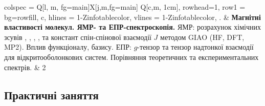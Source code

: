 \documentclass{Syllabus}
\def\lit{\textit{Література для опрацювання:\ }}
\begin{document}
\begin{longtblr}[]{
	colspec = {Q[l, m, fg=main]X[j,m,fg=main] Q[c,m, 1cm]},
    rowhead=1,
	row{1} = {bg=rowfill, c},
	hlines = {1-Z}{infotablecolor},
	vlines = {1-Z}{infotablecolor},
	}
\rownumber. & \textbf{Магнітні властивості молекул. ЯМР- та ЕПР-спектроскопія.}
   ЯМР: розрахунок хімічних зсувів , , , ,  та констант спін-спінової взаємодії $J$ методом GIAO (HF, DFT, MP2). Вплив функціоналу, базису. ЕПР: $g$-тензор та тензор надтонкої взаємодії для відкритооболонкових систем. Порівняння теоретичних та експериментальних спектрів.
   & 2
   \\

\end{longtblr}

\subsection*{Практичні заняття}
\end{document}
